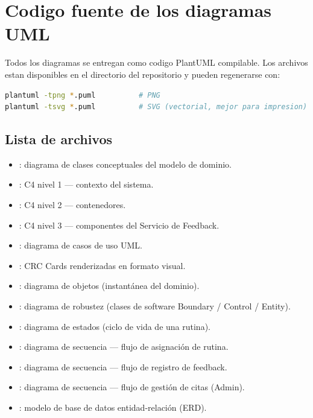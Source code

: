 \chapter{Codigo fuente de los diagramas UML}\label{ch:anexos}

Todos los diagramas se entregan como codigo PlantUML compilable. Los archivos  estan disponibles en el directorio  del repositorio y pueden regenerarse con:

\begin{lstlisting}[language=bash]
plantuml -tpng *.puml          # PNG
plantuml -tsvg *.puml          # SVG (vectorial, mejor para impresion)
\end{lstlisting}

\section{Lista de archivos}

\begin{itemize}
  \item {}: diagrama de clases conceptuales del modelo de dominio.
  \item {}: C4 nivel 1 --- contexto del sistema.
  \item {}: C4 nivel 2 --- contenedores.
  \item {}: C4 nivel 3 --- componentes del Servicio de Feedback.
  \item {}: diagrama de casos de uso UML.
  \item {}: CRC Cards renderizadas en formato visual.
  \item {}: diagrama de objetos (instantánea del dominio).
  \item {}: diagrama de robustez (clases de software Boundary / Control / Entity).
  \item {}: diagrama de estados (ciclo de vida de una rutina).
  \item {}: diagrama de secuencia --- flujo de asignación de rutina.
  \item {}: diagrama de secuencia --- flujo de registro de feedback.
  \item {}: diagrama de secuencia --- flujo de gestión de citas (Admin).
  \item {}: modelo de base de datos entidad-relación (ERD).
\end{itemize}

